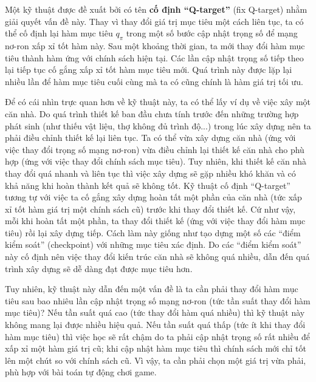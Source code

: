 	Một kỹ thuật được đề xuất bởi \cite{mnihdqn2015} có tên \textbf{cố định ``Q-target''} (fix Q-target) nhằm giải quyết vấn đề này.
	Thay vì thay đổi giá trị mục tiêu một cách liên tục, ta có thể cố định lại hàm mục tiêu $q_{\pi}$ trong một số bước cập nhật trọng số để mạng nơ-ron xấp xỉ tốt hàm này.
	Sau một khoảng thời gian, ta mới thay đổi hàm mục tiêu thành hàm ứng với chính sách hiện tại.
	Các lần cập nhật trọng số tiếp theo lại tiếp tục cố gắng xấp xỉ tốt hàm mục tiêu mới.
	Quá trình này được lặp lại nhiều lần để hàm mục tiêu cuối cùng mà ta có cũng chính là hàm giá trị tối ưu.
	
	Để có cái nhìn trực quan hơn về kỹ thuật này, ta có thể lấy ví dụ về việc xây một căn nhà.
	Do quá trình thiết kế ban đầu chưa tính trước đến những trường hợp phát sinh (như thiếu vật liệu, thợ không đủ trình độ...) trong lúc xây dựng nên ta phải điều chỉnh thiết kế lại liên tục.
	Ta có thể vừa xây dựng căn nhà (ứng với việc thay đổi trọng số mạng nơ-ron) vừa điều chỉnh lại thiết kế căn nhà cho phù hợp (ứng với việc thay đổi chính sách mục tiêu).
	Tuy nhiên, khi thiết kế căn nhà thay đổi quá nhanh và liên tục thì việc xây dựng sẽ gặp nhiều khó khăn và có khả năng khi hoàn thành kết quả sẽ không tốt.
	Kỹ thuật cố định ``Q-target'' tương tự với việc ta cố gắng xây dựng hoàn tất một phần của căn nhà (tức xấp xỉ tốt hàm giá trị một chính sách cũ) trước khi thay đổi thiết kế.
	Cứ như vậy, mỗi khi hoàn tất một phần, ta thay đổi thiết kế (ứng với việc thay đổi hàm mục tiêu) rồi lại xây dựng tiếp.
	Cách làm này giống như tạo dựng một số các ``điểm kiểm soát'' (checkpoint) với những mục tiêu xác định.
	Do các ``điểm kiểm soát'' này cố định nên việc thay đổi kiến trúc căn nhà sẽ không quá nhiều, dẫn đến quá trình xây dựng sẽ dễ dàng đạt được mục tiêu hơn.
	
	Tuy nhiên, kỹ thuật này dẫn đến một vấn đề là ta cần phải thay đổi hàm mục tiêu sau bao nhiêu lần cập nhật trọng số mạng nơ-ron (tức tần suất thay đổi hàm mục tiêu)?
	Nếu tần suất quá cao (tức thay đổi hàm quá nhiều) thì kỹ thuật này không mang lại được nhiều hiệu quả.
	Nếu tần suất quá thấp (tức ít khi thay đổi hàm mục tiêu) thì việc học sẽ rất chậm do ta phải cập nhật trọng số rất nhiều để xấp xỉ một hàm giá trị cũ; khi cập nhật hàm mục tiêu thì chính sách mới chỉ tốt lên một chút so với chính sách cũ.
	Vì vậy, ta cần phải chọn một giá trị vừa phải, phù hợp với bài toán tự động chơi game.

